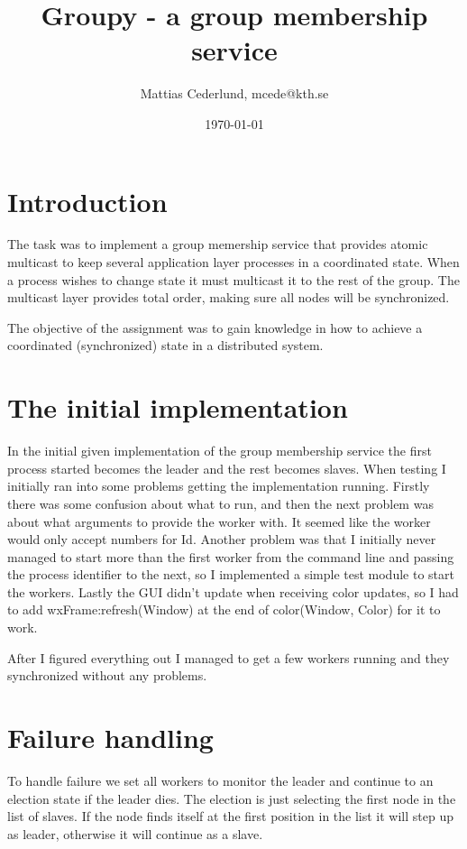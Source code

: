 \documentclass[a4paper, 11pt]{article}
\title{Groupy - a group membership service}
\author{Mattias Cederlund, mcede@kth.se}
\date{\today{}}
\begin{document}
\maketitle

\section{Introduction}

The task was to implement a group memership service that provides atomic multicast to keep several application layer processes in a coordinated state. When a process wishes to change state it must multicast it to the rest of the group. The multicast layer provides total order, making sure all nodes will be synchronized.

The objective of the assignment was to gain knowledge in how to achieve a coordinated (synchronized) state in a distributed system.

\section{The initial implementation}

In the initial given implementation of the group membership service the first process started becomes the leader and the rest becomes slaves. When testing I initially ran into some problems getting the implementation running. Firstly there was some confusion about what to run, and then the next problem was about what arguments to provide the worker with. It seemed like the worker would only accept numbers for Id. Another problem was that I initially never managed to start more than the first worker from the command line and passing the process identifier to the next, so I implemented a simple test module to start the workers. Lastly the GUI didn't update when receiving color updates, so I had to add wxFrame:refresh(Window) at the end of color(Window, Color) for it to work.

After I figured everything out I managed to get a few workers running and they synchronized without any problems.

\section{Failure handling}

To handle failure we set all workers to monitor the leader and continue to an election state if the leader dies. The election is just selecting the first node in the list of slaves. If the node finds itself at the first position in the list it will step up as leader, otherwise it will continue as a slave. 
\end{document}
